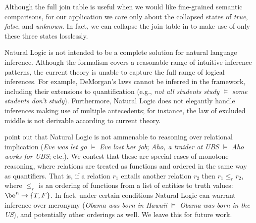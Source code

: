 %
%
Although the full join table is useful when we would like fine-grained
  semantic comparisons, for our application we care only about the
  collapsed states of \textit{true}, \textit{false}, and \textit{unknown}.
In fact, we can collapse the join table in  to make use
  of only these three states losslessly.


%
%
Natural Logic is not intended to be a complete solution for natural
  language inference.
Although the formalism covers a reasonable range of intuitive inference
  patterns, the current theory is unable to capture the full range
  of logical inferences.
For example, DeMorgan's laws 
  cannot be inferred in the framework,
  including their extensions to quantification
  (e.g., \textit{not all students study} $\models$ \textit{some students don't study}).
Furthermore, Natural Logic does not elegantly handle inferences
  making use of multiple antecedents; for instance, the law of
  excluded middle is not derivable according to current theory.

 point out that Natural Logic is
  not ammenable to reasoning over relational implication
  (\textit{Eve was let go} $\models$ \textit{Eve lost her job};
   \textit{Aho, a traider at UBS} $\models$ \textit{Aho works for UBS};
   etc.).
We contest that these are special cases of monotone reasoning, where
  relations are treated as functions and ordered in the same way as
  quantifiers.
That is, if a relation $r_1$ entails another relation $r_2$ then
  $r_1 \leq_r r_2$, where $\leq_r$ is an ordering of functions from
  a list of entities to truth values: $\be^n \rightarrow \{T,F\}$.
In fact, under certain conditions Natural Logic can warrant inference
  over meronymy
  (\textit{Obama was born in Hawaii} $\models$ \textit{Obama was born in the US}),
  and potentially other orderings as well.
We leave this for future work.


